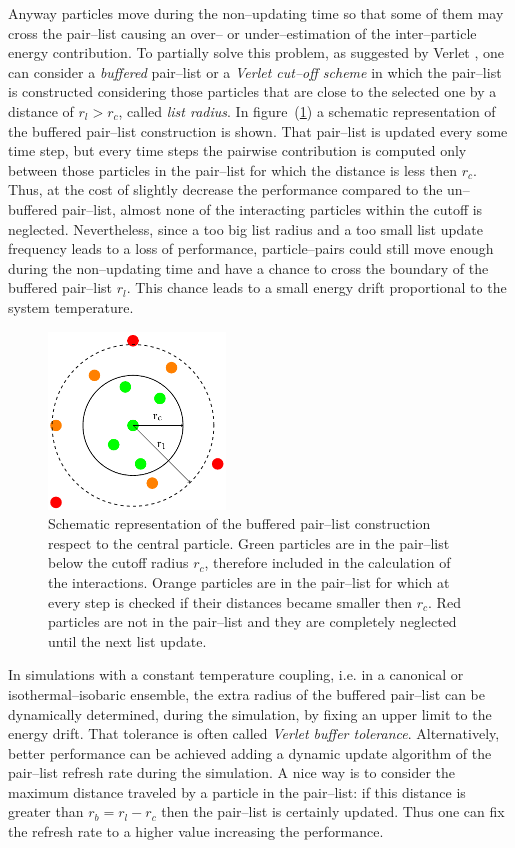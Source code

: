 Anyway particles move during the non--updating time so that some of them may cross the pair--list causing an
over-- or under--estimation of the inter--particle energy contribution. To partially solve this problem, as
suggested by Verlet \cite{VerletList}, one can consider a \textit{buffered} pair--list or a \textit{Verlet
cut--off scheme} in which the pair--list is constructed considering those particles that are close to the
selected one by a distance of $r_l > r_c$, called \textit{list radius}. In figure~(\ref{fig:pairlist}) a schematic 
representation of the buffered pair--list construction is shown. That pair--list is updated every some
time step, but every time steps the pairwise contribution is computed only between those particles in the
pair--list for which the distance is less then $r_c$. Thus, at the cost of slightly decrease the performance
compared to the un--buffered pair--list, almost none of the interacting particles within the cutoff is neglected.
Nevertheless, since a too big list radius and a too small list update frequency leads to a loss of performance,
particle--pairs could still move enough during the non--updating time and have a chance to cross the boundary of
the buffered pair--list $r_l$. This chance leads to a small energy drift proportional to the system temperature.
\begin{figure}
	\includegraphics[width=0.42\textwidth]{./img/pairList/pairList}
	\caption{Schematic representation of the buffered pair--list construction respect to the central particle.
	Green particles are in the pair--list below the cutoff radius $r_c$, therefore included in the calculation of the interactions. Orange particles are in the pair--list for which at every step is checked if their distances became smaller then $r_c$. Red particles are not in the pair--list and they are completely neglected until the next list update.}%
	\label{fig:pairlist}
\end{figure}

In simulations with a constant temperature coupling, i.e. in a canonical or isothermal--isobaric ensemble, the
extra radius of the buffered pair--list can be dynamically determined, during the simulation, by fixing an upper
limit to the energy drift. That tolerance is often called \textit{Verlet buffer tolerance}. Alternatively, better 
performance can be achieved adding a dynamic update algorithm of the pair--list refresh rate during the
simulation. A nice way is to consider the maximum distance traveled by a particle in the pair--list: if this
distance is greater than $r_b = r_l - r_c$ then the pair--list is certainly updated. Thus one can fix the refresh
rate to a higher value increasing the performance.

